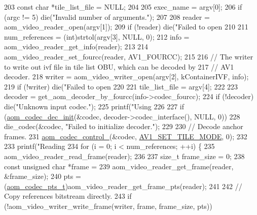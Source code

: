 \begin{DoxyCodeInclude}
{203   \textcolor{keyword}{const} \textcolor{keywordtype}{char} *tile\_list\_file = NULL;
204 
205   exec\_name = argv[0];
206   \textcolor{keywordflow}{if} (argc != 5) die(\textcolor{stringliteral}{"Invalid number of arguments."});
207 
208   reader = aom\_video\_reader\_open(argv[1]);
209   \textcolor{keywordflow}{if} (!reader) die(\textcolor{stringliteral}{"Failed to open %
210 
211   num\_references = (int)strtol(argv[3], NULL, 0);
212   info = aom\_video\_reader\_get\_info(reader);
213 
214   aom\_video\_reader\_set\_fourcc(reader, AV1\_FOURCC);
215 
216   \textcolor{comment}{// The writer to write out ivf file in tile list OBU, which can be decoded by}
217   \textcolor{comment}{// AV1 decoder.}
218   writer = aom\_video\_writer\_open(argv[2], kContainerIVF, info);
219   \textcolor{keywordflow}{if} (!writer) die(\textcolor{stringliteral}{"Failed to open %
220 
221   tile\_list\_file = argv[4];
222 
223   decoder = get\_aom\_decoder\_by\_fourcc(info->codec\_fourcc);
224   \textcolor{keywordflow}{if} (!decoder) die(\textcolor{stringliteral}{"Unknown input codec."});
225   printf(\textcolor{stringliteral}{"Using %
226 
227   \textcolor{keywordflow}{if} (\hyperlink{group__decoder_gafdbfca65b19ab1f6d72b32cd01753b9b}{aom\_codec\_dec\_init}(&codec, decoder->codec\_interface(), NULL, 0))
228     die\_codec(&codec, \textcolor{stringliteral}{"Failed to initialize decoder."});
229 
230   \textcolor{comment}{// Decode anchor frames.}
231   \hyperlink{group__codec_ga51eb332a40dcacc39000ab8e0be36b79}{aom\_codec\_control\_}(&codec, \hyperlink{group__aom__decoder_gga3865fd4b3192489baa9a5c3632ebe97ba0795d8084ae8c78528c01587198df9e2}{AV1\_SET\_TILE\_MODE}, 0);
232 
233   printf(\textcolor{stringliteral}{"Reading %
234   \textcolor{keywordflow}{for} (i = 0; i < num\_references; ++i) \{
235     aom\_video\_reader\_read\_frame(reader);
236 
237     \textcolor{keywordtype}{size\_t} frame\_size = 0;
238     \textcolor{keyword}{const} \textcolor{keywordtype}{unsigned} \textcolor{keywordtype}{char} *frame =
239         aom\_video\_reader\_get\_frame(reader, &frame\_size);
240     pts = (\hyperlink{group__encoder_ga958524226c9a65251c9e4f7bb78fc606}{aom\_codec\_pts\_t})aom\_video\_reader\_get\_frame\_pts(reader);
241 
242     \textcolor{comment}{// Copy references bitstream directly.}
243     \textcolor{keywordflow}{if} (!aom\_video\_writer\_write\_frame(writer, frame, frame\_size, pts))
}}}}}
\end{DoxyCodeInclude}
